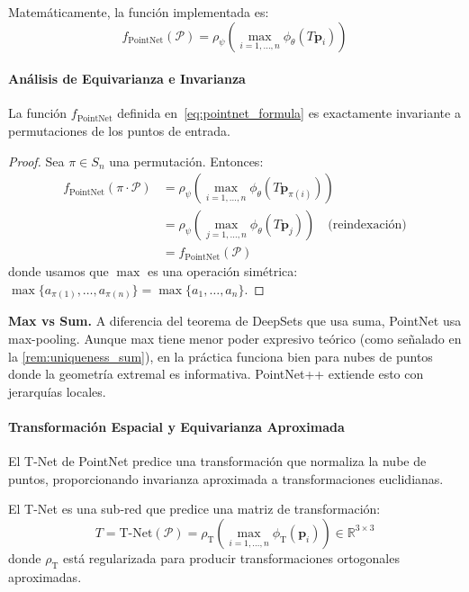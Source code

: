 Matemáticamente, la función implementada es:
\begin{equation}
f_{\text{PointNet}}(\mathcal{P}) = \rho_\psi\left(\max_{i=1,\ldots,n} \phi_\theta(T \mathbf{p}_i)\right)
\label{eq:pointnet_formula}
\end{equation}

\paragraph{Análisis de Equivarianza e Invarianza}

\begin{proposition}\label{prop:pointnet_invariance}
La función $f_{\text{PointNet}}$ definida en~\eqref{eq:pointnet_formula} es exactamente invariante a permutaciones de los puntos de entrada.
\end{proposition}

\begin{proof}
Sea $\pi \in S_n$ una permutación. Entonces:
\begin{align}
f_{\text{PointNet}}(\pi \cdot \mathcal{P}) &= \rho_\psi\left(\max_{i=1,\ldots,n} \phi_\theta(T \mathbf{p}_{\pi(i)})\right) \\
&= \rho_\psi\left(\max_{j=1,\ldots,n} \phi_\theta(T \mathbf{p}_j)\right) \quad \text{(reindexación)} \\
&= f_{\text{PointNet}}(\mathcal{P})
\end{align}
donde usamos que $\max$ es una operación simétrica: $\max\{a_{\pi(1)}, \ldots, a_{\pi(n)}\} = \max\{a_1, \ldots, a_n\}$.
\end{proof}

\textbf{Max vs Sum.} A diferencia del teorema de DeepSets que usa suma, PointNet usa max-pooling. Aunque max tiene menor poder expresivo teórico (como señalado en la \autoref{rem:uniqueness_sum}), en la práctica funciona bien para nubes de puntos donde la geometría extremal es informativa. PointNet++ extiende esto con jerarquías locales.

\paragraph{Transformación Espacial y Equivarianza Aproximada}

El T-Net de PointNet predice una transformación que normaliza la nube de puntos, proporcionando invarianza aproximada a transformaciones euclidianas.

\begin{definition}\label{def:stn_points}
El T-Net es una sub-red que predice una matriz de transformación:
\begin{equation}
T = \text{T-Net}(\mathcal{P}) = \rho_{\text{T}}\left(\max_{i=1,\ldots,n} \phi_{\text{T}}(\mathbf{p}_i)\right) \in \mathbb{R}^{3 \times 3}
\end{equation}
donde $\rho_{\text{T}}$ está regularizada para producir transformaciones ortogonales aproximadas.
\end{definition}

